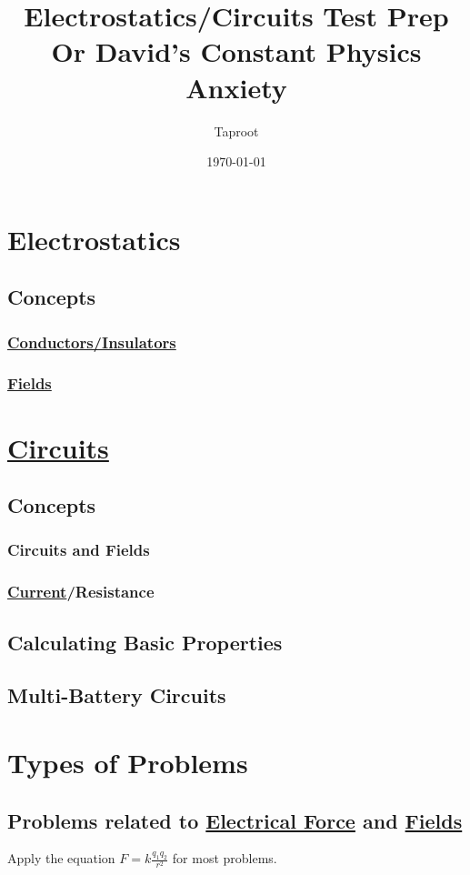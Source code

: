 \documentclass[letterpaper]{article}
\author{Taproot}
\date{\today}
\title{Electrostatics/Circuits Test Prep\\\medskip
\large Or David's Constant Physics Anxiety}
\renewcommand{\tableofcontents}{}
\begin{document}
\tableofcontents


\section{Electrostatics}
\label{sec:orgd3c48e0}
\subsection{Concepts}
\label{sec:orgde1cf61}
\subsubsection{\href{phys250-electrostatics.org}{Conductors/Insulators}}
\label{sec:org0aed6b3}
\subsubsection{\href{phys250-fields.org}{Fields}}
\label{sec:org29b9689}
\section{\href{circuits.org}{Circuits}}
\label{sec:org1cd14fd}
\subsection{Concepts}
\label{sec:org92e9044}
\subsubsection{Circuits and Fields}
\label{sec:org2fe63f4}
\subsubsection{\href{20200909105807-current.org}{Current}/Resistance}
\label{sec:orgd9ceb32}
\subsection{Calculating Basic Properties}
\label{sec:org1c34e98}
\subsection{Multi-Battery Circuits}
\label{sec:org14e4771}
\section{Types of Problems}
\label{sec:orgf3fc7c0}
\subsection{Problems related to \href{phys250-electricalforce.org}{Electrical Force} and \href{phys250-fields.org}{Fields}}
\label{sec:org6a4e756}
Apply the equation \(F = k\frac{q_1q_2}{r^2}\) for most problems.
\end{document}
